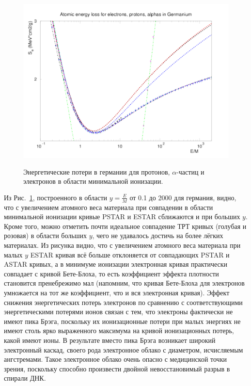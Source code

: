 \documentclass[a4paper,12pt]{article}
\begin{document}
\begin{large}
  \begin{figure}[ht]
    {
       \includegraphics[width=0.99\linewidth]{images/epa_ge_s}
    }
    \caption{Энергетические потери в германии для протонов, $\alpha$-частиц и электронов в области минимальной ионизации.}
    \label{fig:dEdxGeS}
  \end{figure}
  Из Рис.~\ref{fig:dEdxGeS}, построенного в области $y=\frac{E}{M}$ от 0.1 до 2000 для германия, видно, что с увеличением атомного веса материала при совпадении в области минимальной ионизации кривые PSTAR и ESTAR сближаются и при больших $y$.
  Кроме того, можно отметить почти идеальное совпадение ТРТ кривых (голубая и розовая) в области больших $y$, чего не удавалось достичь на более лёгких материалах.
  Из рисунка видно, что с увеличением атомного веса материала при малых $y$ ESTAR кривая всё больше отклоняется от совпадающих PSTAR и ASTAR кривых, а в минимуме ионизации электронная кривая практически совпадает с кривой Бете-Блоха, то есть коэффициент эффекта плотности становится пренебрежимо мал (напомним, что кривая Бете-Блоха для электронов умножается на тот же коэффициент, что и вся электронная кривая).
  Эффект снижения энергетических потерь электронов по сравнению с соответствующими энергетическими потерями ионов связан с тем, что электроны фактически не имеют пика Брэга, поскольку их ионизационные потери при малых энергиях не имеют столь ярко выраженного максимума на кривой ионизационных потерь, какой имеют ионы.
  В результате вместо пика Брэга возникает широкий электронный каскад, своего рода электронное облако с диаметром, исчисляемым ангстремами.
  Такое электронное облако очень опасно с медицинской точки зрения, поскольку способно произвести двойной невосстановимый разрыв в спирали ДНК.

\end{large}
\end{document}
